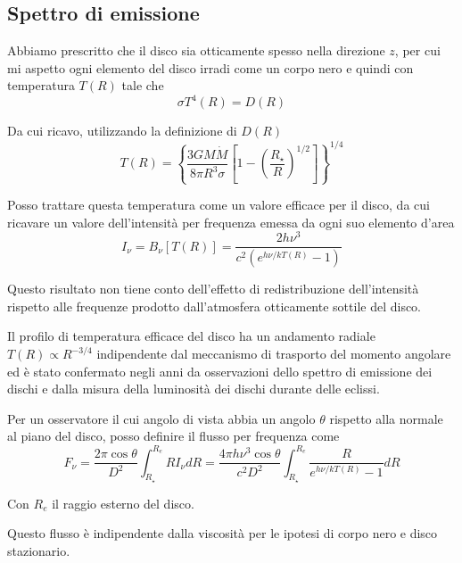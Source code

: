 \documentclass[a4paperbi]{article}
\begin{document}
\subsection{Spettro di emissione}

	Abbiamo prescritto che il disco sia otticamente spesso nella direzione $z$, per cui mi aspetto ogni elemento del disco irradi come un corpo nero e quindi con temperatura $T(R)$ tale che
	\begin{equation}
		\sigma T^4(R)=D(R)
	\end{equation}
	
	Da cui ricavo, utilizzando la definizione di $D(R)$
	\begin{equation}
		T(R)=\left\{\frac{3GM\dot{M}}{8\pi R^3\sigma}\left[1-\left(\frac{R_{\star}}{R}\right)^{1/2}\right]\right\}^{1/4}
	\end{equation}
	
	Posso trattare questa temperatura come un valore efficace per il disco, da cui ricavare un valore dell'intensità per frequenza emessa da ogni suo elemento d'area
	\begin{equation}
		I_\nu=B_\nu[T(R)]=\frac{2h\nu^3}{c^2(e^{h\nu/kT(R)}-1)}
	\end{equation}
	
	Questo risultato non tiene conto dell'effetto di redistribuzione dell'intensità rispetto alle frequenze prodotto dall'atmosfera otticamente sottile del disco.

	Il profilo di temperatura efficace del disco ha un andamento radiale $T(R)\propto R^{-3/4}$ indipendente dal meccanismo di trasporto del momento angolare ed è stato confermato negli anni da osservazioni dello spettro di emissione dei dischi e dalla misura della luminosità dei dischi durante delle eclissi.
	
	Per un osservatore il cui angolo di vista abbia un angolo $\theta$ rispetto alla normale al piano del disco, posso definire il flusso per frequenza come
	\begin{equation}
		F_\nu=\frac{2\pi \cos{\theta}}{D^2}\int^{R_{e}}_{R_{\star}}RI_\nu dR=\frac{4\pi h\nu^3\cos{\theta}}{c^2D^2}\int^{R_{e}}_{R_{\star}}\frac{R}{e^{h\nu/kT(R)}-1}dR
	\end{equation}
	
	Con $R_e$ il raggio esterno del disco.
	
	Questo flusso è indipendente dalla viscosità per le ipotesi di corpo nero e disco stazionario.
	
\end{document}
